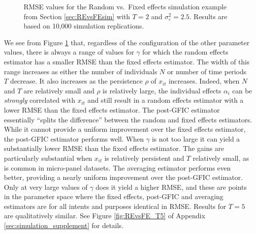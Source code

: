 \begin{figure}[htbp]
  \centering
  
  \caption{RMSE values for the Random vs.\ Fixed effects simulation example from Section \ref{sec:REvsFEsim} with $T=2$ and  $\sigma_{\varepsilon}^2 = 2.5$. Results are based on 10,000 simulation replications.}
  \label{fig:REvsFE_T2}
\end{figure}

We see from Figure \ref{fig:REvsFE_T2} that, regardless of the configuration of the other parameter values, there is always a range of values for $\gamma$ for which the random effects estimator has a smaller RMSE than the fixed effects estimator.
The width of this range increases as either the number of individuals $N$ or number of time periods $T$ decrease.
It also increases as the persistence $\rho$ of $x_{it}$ increases.
Indeed, when $N$ and $T$ are relatively small and $\rho$ is relatively large, the individual effects $\alpha_{i}$ can be \emph{strongly} correlated with $x_{it}$ and still result in a random effects estimator with a lower RMSE than the fixed effects estimator. 
The post-GFIC estimator essentially ``splits the difference'' between the random and fixed effects estimators.
While it cannot provide a uniform improvement over the fixed effects estimator, the post-GFIC estimator performs well.
When $\gamma$ is not too large it can yield a substantially lower RMSE than the fixed effects estimator.
The gains are particularly substantial when $x_{it}$ is relatively persistent and $T$ relatively small, as is common in micro-panel datasets.
The averaging estimator performs even better, providing a nearly uniform improvement over the post-GFIC estimator.
Only at very large values of $\gamma$ does it yield a higher RMSE, and these are points in the parameter space where the fixed effects, post-GFIC and averaging estimators are for all intents and purposes identical in RMSE.
Results for $T=5$ are qualitatively similar.
See Figure \ref{fig:REvsFE_T5} of Appendix \ref{sec:simulation_supplement} for details.
